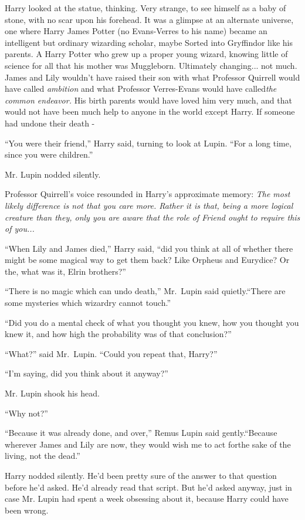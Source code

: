 Harry looked at the statue, thinking. Very strange, to see himself as a baby of stone, with no scar upon his forehead. It was a glimpse at an alternate universe, one where Harry James Potter (no Evans-Verres to his name) became an intelligent but ordinary wizarding scholar, maybe Sorted into Gryffindor like his parents. A Harry Potter who grew up a proper young wizard, knowing little of science for all that his mother was Muggleborn. Ultimately changing... not much. James and Lily wouldn't have raised their son with what Professor Quirrell would have called \emph{ambition} and what Professor Verres-Evans would have called\emph{the common endeavor.} His birth parents would have loved him very much, and that would not have been much help to anyone in the world except Harry. If someone had undone their death -

“You were their friend,” Harry said, turning to look at Lupin. “For a long time, since you were children.”

Mr. Lupin nodded silently.

Professor Quirrell's voice resounded in Harry's approximate memory: \emph{The most likely difference is not that you care more. Rather it is that, being a more logical creature than they, only you are aware that the role of Friend ought to require this of you...}

“When Lily and James died,” Harry said, “did you think at all of whether there might be some magical way to get them back? Like Orpheus and Eurydice? Or the, what was it, Elrin brothers?”

“There is no magic which can undo death,” Mr.~Lupin said quietly.“There are some mysteries which wizardry cannot touch.”

“Did you do a mental check of what you thought you knew, how you thought you knew it, and how high the probability was of that conclusion?”

“What?” said Mr.~Lupin. “Could you repeat that, Harry?”

“I'm saying, did you think about it anyway?”

Mr. Lupin shook his head.

“Why not?”

“Because it was already done, and over,” Remus Lupin said gently.“Because wherever James and Lily are now, they would wish me to act forthe sake of the living, not the dead.”

Harry nodded silently. He'd been pretty sure of the answer to that question before he'd asked. He'd already read that script. But he'd asked anyway, just in case Mr. Lupin had spent a week obsessing about it, because Harry could have been wrong.

